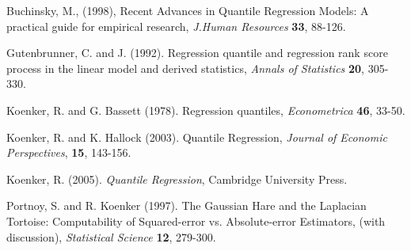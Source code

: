 {\sc Buchinsky, M.}, (1998),
Recent Advances in Quantile Regression Models:
A practical guide for empirical research,
{\it J.Human Resources}  {\bf 33}, {88-126}.


{\sc Gutenbrunner, C. and J. \Jureckova} (1992).
Regression quantile and regression rank score process in the linear model and
derived statistics,  {\it Annals of Statistics} {\bf 20}, 305-330.
 

{\sc Koenker, R. and G. Bassett} (1978).  Regression quantiles,
{\it Econometrica} {\bf 46}, 33-50.

{\sc Koenker, R. and K. Hallock} (2003).  Quantile Regression,
{\it Journal of Economic Perspectives}, {\bf 15}, 143-156.

{\sc Koenker, R.} (2005).  {\it Quantile Regression}, Cambridge University
Press.

{\sc Portnoy, S. and R. Koenker } (1997).  The Gaussian Hare and the Laplacian Tortoise:
Computability of Squared-error vs. Absolute-error Estimators, (with discussion),
{\it Statistical Science} {\bf 12}, 279-300.

 
